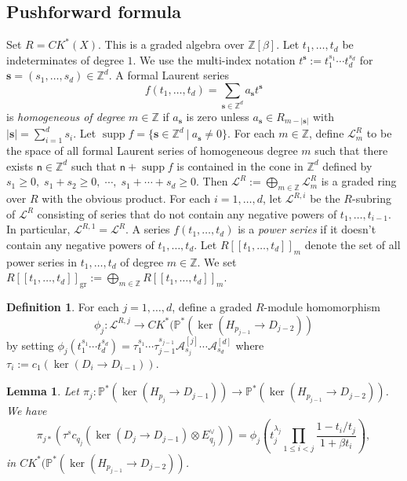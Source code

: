 \documentclass[12pt, reqno,sumlimits]{amsart}
\newtheorem{lem}[thm]{Lemma}
\theoremstyle{definition}
\newtheorem{defn}[thm]{Definition}
\numberwithin{equation}{section}
\newcommand{\PP}{{\mathbb P}}
\newcommand{\ZZ}{{\mathbb Z}}
\newcommand{\sfn }{{\mathsf n}}
\newcommand{\bfs}{{\mathbf s}}
\newcommand{\CK}{{C\!K}}
\newcommand{\calL}{{\mathcal L}}
\newcommand{\scA}{{\mathscr A}}
\newcommand{\gr}{\operatorname{gr}}
\newcommand{\supp}{{\operatorname{supp}}}
\begin{document}
\subsection{Pushforward formula}
Set $R=\CK^*(X)$. This is a graded algebra over $\ZZ[\beta]$. Let $t_1,\ldots,t_d$ be indeterminates of degree $1$. We use the multi-index notation $t^\bfs:=t_1^{s_1}\cdots t_d^{s_d}$ for $\bfs=(s_1,\dots,s_d)\in \ZZ^d$. A formal Laurent series 
\[
f(t_1,\ldots,t_d)=\sum_{\bfs\in\ZZ^d}a_{\bfs}t^{\bfs}
\]
is {\em homogeneous of degree} $m\in \ZZ$ if $a_{\bfs}$ is zero unless $a_{\bfs}\in R_{m-|\bfs|}$ with $|\bfs|=\sum_{i=1}^d s_i$. Let $\supp f = \{\bfs \in \ZZ^d \ |\ a_{\bfs}\not=0\}$.
For each $m \in \ZZ$, define $\calL^{R}_m$ to be the space of all formal Laurent series of homogeneous degree $m$ such that there exists $\sfn\in \ZZ^d$ such that $\sfn + \supp f$ is contained in the cone in $\ZZ^d$ defined by $s_1\geq0, \; s_1+s_2\geq 0, \;\cdots, \; s_1+\cdots + s_d \geq 0$. Then $\calL^{R}:=\bigoplus_{m\in \ZZ} \calL^{R}_m$ is a graded ring over $R$ with the obvious product. 
For each $i=1,\dots, d$, let $\calL^{R,i}$ be the $R$-subring of $\calL^R$ consisting of series that do not contain any negative powers of $ t_1,\dots, t_{i-1}$.  In particular, $\calL^{R,1}=\calL^{R}$. 
A series $f(t_1,\ldots,t_d)$ is a {\em power series} if it doesn't contain any negative powers of $t_1,\dots,t_d$. Let $R[[t_1,\ldots,t_d]]_{m}$ denote the set of all power series in $t_1,\dots, t_d$ of degree $m\in \ZZ$. We set $R[[t_1,\ldots,t_d]]_{\gr}:=\bigoplus_{m\in \ZZ}R[[t_1,\ldots,t_d]]_{m}$.
\begin{defn}
For each $j=1,\dots, d$, define a graded $R$-module homomorphism
\[
\phi_j: \calL^{R,j} \to \CK^*(\PP^*(\ker(H_{p_{j-1}} \to D_{j-2}))
\]
by setting $\phi_j( t_1^{s_1}\cdots  t_d^{s_d})= \tau_1^{s_1}\cdots \tau_{j-1}^{s_{j-1}}\scA_{s_j}^{[j]}\cdots \scA_{s_d}^{[d]}$ where $\tau_i:=c_1(\ker(D_i \to D_{i-1}))$.
\end{defn}
\begin{lem}\label{lempush}
Let $\pi_j: \PP^*(\ker(H_{p_j} \to D_{j-1}))\to \PP^*(\ker(H_{p_{j-1}} \to D_{j-2}))$. We have
\[
\pi_{j*}(\tau^sc_{q_j}(\ker(D_j \to D_{j-1}) \otimes E_{q_j}^{\vee})) =  \phi_j\left(t_j^{\lambda_j} \prod_{1\leq i< j} \frac{1 - t_i/t_j}{1+\beta t_i} \right),
\]
in $\CK^*(\PP^*(\ker(H_{p_{j-1}} \to D_{j-2}))$.
\end{lem}
\end{document}
